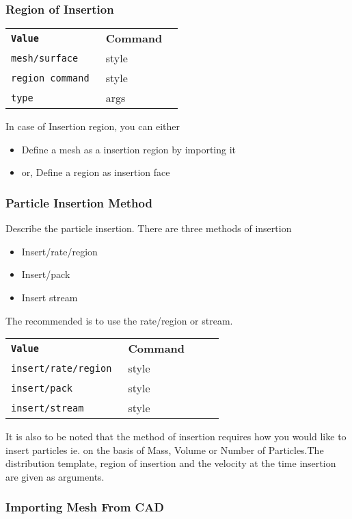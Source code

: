 \documentclass[8pt]{extarticle} %
\begin{document}
\begin{multicols}{3}
\vspace*{2ex}

\subsubsection{Region of Insertion}
\begin{tabular}{L{0.55\linewidth} L{0.45\linewidth}}
  \tt \textbf{Value}  &  \textbf{Command} \\
  \tt mesh/surface & style \\
  \tt region command & style \\
  \tt type  & args \\
\end{tabular}
\vspace*{2ex}
In case of Insertion region, you can either
\begin{itemize}
\item Define a mesh as a insertion region by importing it
\item or, Define a region as insertion face
\end{itemize}

\vspace*{2ex}
\subsubsection{Particle Insertion Method}
Describe the particle insertion. There are three methods of insertion
\begin{itemize}
\item Insert/rate/region
\item Insert/pack
\item Insert stream
\end{itemize}
The recommended is to use the rate/region or stream.
\begin{tabular}{L{0.55\linewidth} L{0.45\linewidth}}
  \tt \textbf{Value}  &  \textbf{Command} \\
  \tt insert/rate/region & style \\
  \tt insert/pack & style \\
  \tt insert/stream & style \\
\end{tabular}
It is also to be noted that the method of insertion requires how you would like to insert particles ie. on the basis of Mass, Volume or Number of Particles.The distribution template, region of insertion and the velocity at the time insertion are given as arguments.


\subsubsection{Importing Mesh From CAD}


\end{multicols}
\end{document}
